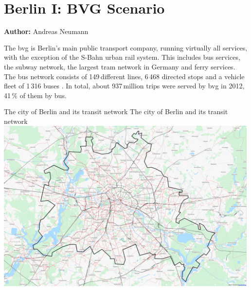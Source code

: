 \chapter{Berlin I: BVG Scenario}
\label{ch:berlinI}
\hfill \textbf{Author:} Andreas Neumann


The \gls{bvg} is Berlin's main public transport company, running virtually all services, with the exception of the S-Bahn urban rail system. This includes bus services, the subway network, the largest tram network in Germany and ferry services. The bus network consists of 149\,different lines, 6\,468 directed stops and a vehicle fleet of 1\,316 buses \citep{BVG2012}. In total, about 937\,million trips were served by \gls{bvg} in 2012, 41\,\% of them by bus.

\createfigure%
{The city of Berlin and its transit network}%
{The city of Berlin and its transit network}%
{\label{fig:scenario_berlin_i}}%
{\includegraphics[width=0.99\textwidth, angle=0]{scenarios/figures/berlin_pt.PNG}}%
{}

